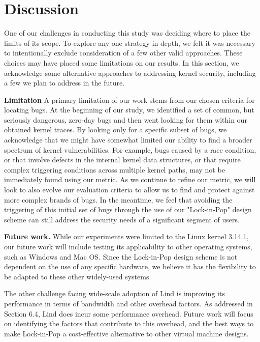 \section{Discussion}
\label{sec.limitation}

One of our challenges in conducting this study was deciding where to place the
limits of its scope.  To explore any one strategy
in depth, we felt it was necessary to intentionally exclude consideration of
a few other valid approaches. These choices may have placed some limitations on our results.
In this section, we acknowledge some alternative
approaches to addressing kernel security, including a few we plan
to address in the future.

\textbf{Limitation }
A primary limitation of our work stems from our chosen criteria for locating
bugs. At the beginning
of our study, we identified a set of common, but seriously dangerous, zero-day bugs
and then went looking for them within our obtained kernel traces. By looking only
for a specific subset of bugs, we acknowledge that we might have somewhat limited our
ability to find a broader spectrum of kernel vulnerabilities. For example, bugs
caused by a race condition, or that involve defects in the internal kernel data
structures, or that require complex triggering conditions across multiple kernel
paths, may not be immediately found using our metric. As we continue to refine
our metric, we will look to also evolve our evaluation
criteria to allow us to find and protect against more complex brands of bugs.
In the meantime, we feel that avoiding the triggering of this initial set of bugs
through the use of our "Lock-in-Pop" design scheme can still address the security
needs of a significant segment of users.

\textbf{Future work.}
While our experiments were limited to the Linux kernel 3.14.1, our future work
will include testing its applicability to other operating systems, such as
Windows and Mac OS. Since the Lock-in-Pop design scheme is not dependent on the use of any
specific hardware, we believe it has the flexibility to be adapted to these other
widely-used systems.

The other challenge facing wide-scale adoption of Lind is improving its
performance in terms of bandwidth and other overhead factors. As addressed in
Section 6.4, Lind does incur some performance overhead. Future work will focus on identifying
the factors that contribute to this overhead, and the best ways to make Lock-in-Pop
a cost-effective alternative to other virtual machine designs.
